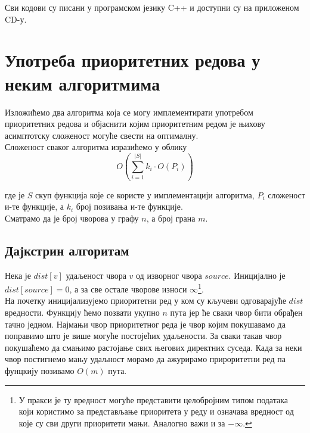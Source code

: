 \documentclass[11pt, a4paper]{article}
\theoremstyle{remark}
\numberwithin{equation}{section}
\begin{document}
	\noindent Сви кодови су писани у програмском језику C++ и доступни су на приложеном CD-у.
	
	\newpage
	
	\section {Употреба приоритетних редова у неким алгоритмима}
	Изложићемо два алгоритма која се могу имплементирати употребом приоритетних редова и објаснити којим приоритетним редом је њихову асимптотску сложеност могуће свести на оптималну. \\
	
	\noindent Сложеност сваког алгоритма изразићемо у облику
	\begin{equation*}
	O \left (\sum_{i=1}^{\left | S \right |} k_i \cdot O(P_i) \right)
	\end{equation*}
	
	\noindent где је $S$ скуп функција које се користе у имплементацији алгоритма, $P_i$ сложеност и-те функције, а $k_i$ број позивања и-те функције. \\
	
	\noindent Сматрамо да је број чворова у графу $n$, а број грана $m$.
	
	\subsection{Дајкстрин алгоритам}
	
	Нека је $dist[v]$ удаљеност чвора $v$ од изворног чвора $source$. Иницијално је $dist[source]=0$, а за све остале чворове износи $\infty$\footnote{У пракси је ту вредност могуће представити целобројним типом података који користимо за представљање приоритета у реду и означава вредност од које су сви други приоритети мањи. Аналогно важи и за $-\infty$.}. \\
	
	\indent На почетку иницијализујемо приоритетни ред у ком су кључеви одговарајуће $dist$ вредности. Функцију  ћемо позвати укупно $n$ пута јер ће сваки чвор бити обрађен тачно једном. Најмањи чвор приоритетног реда је чвор којим покушавамо да поправимо што је више могуће постојећих удаљености. За сваки такав чвор покушаћемо да смањимо растојање свих његових директних суседа. Када за неки чвор постигнемо мању удаљност морамо да ажурирамо прироритетни ред па фунцкију  позивамо $O(m)$ пута. \\
	
\end{document}

